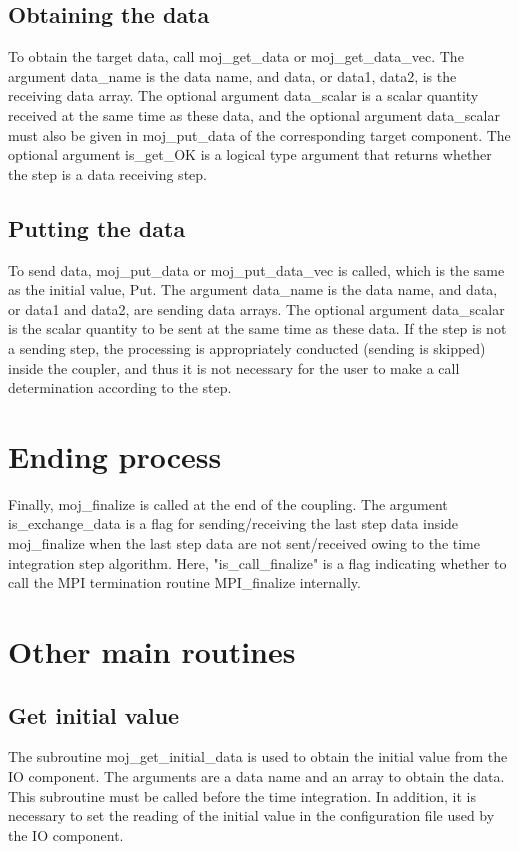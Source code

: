 \documentclass[11pt,a4paper]{report}
\begin{document}
\subsection{Obtaining the data}
To obtain the target data, call moj\_get\_data or moj\_get\_data\_vec. 
The argument data\_name is the data name, and data, or data1, data2, is the receiving data array.
The optional argument data\_scalar is a scalar quantity received at the same time as these data, and the optional argument data\_scalar must also be given in moj\_put\_data of the corresponding target component.
The optional argument is\_get\_OK is a logical type argument that returns whether the step is a data receiving step.

\subsection{Putting the data}
To send data, moj\_put\_data or moj\_put\_data\_vec is called, which is the same as the initial value, Put. 
The argument data\_name is the data name, and data, or data1 and data2, are sending data arrays. 
The optional argument data\_scalar is the scalar quantity to be sent at the same time as these data. 
If the step is not a sending step, the processing is appropriately conducted (sending is skipped) inside the coupler, and thus it is not necessary for the user to make a call determination according to the step.

\section{Ending process}
Finally, moj\_finalize is called at the end of the coupling. 
The argument is\_exchange\_data is a flag for sending/receiving the last step data inside moj\_finalize when the last step data are not sent/received owing to the time integration step algorithm. Here,
"is\_call\_finalize" is a flag indicating whether to call the MPI termination routine MPI\_finalize internally.

\section{Other main routines}
\subsection{Get initial value}
The subroutine moj\_get\_initial\_data is used to obtain the initial value from the IO component. 
The arguments are a data name and an array to obtain the data. 
This subroutine must be called before the time integration. 
In addition, it is necessary to set the reading of the initial value in the configuration file used by the IO component.
\end{document}
